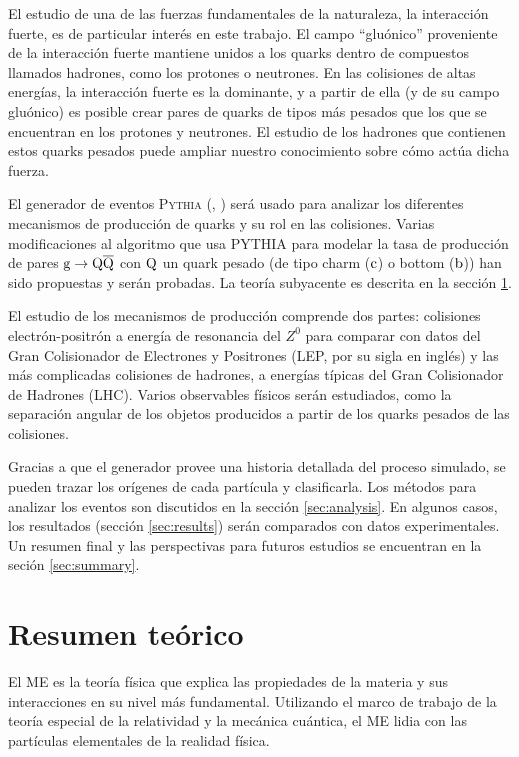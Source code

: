 \documentclass[a4paper,12pt]{article}
\begin{document}
El estudio de una de las fuerzas fundamentales de la naturaleza, la interacción fuerte, es de particular interés en este trabajo. El campo ``gluónico'' proveniente de la interacción fuerte mantiene unidos a los quarks dentro de compuestos llamados hadrones, como los protones o neutrones. En las colisiones de altas energías, la interacción fuerte es la dominante, y a partir de ella (y de su campo gluónico) es posible crear pares de quarks de tipos más pesados que los que se encuentran en los protones y neutrones. El estudio de los hadrones que contienen estos quarks pesados puede ampliar nuestro conocimiento sobre cómo actúa dicha fuerza.

El generador de eventos \textsc{Pythia} (\cite{Sjostrand:2006za}, \cite{Sjostrand:2007gs}) será usado para analizar los diferentes mecanismos de producción de quarks y su rol en las colisiones. Varias modificaciones al algoritmo que usa PYTHIA para modelar la tasa de producción de pares ${\mathrm g}\to{\mathrm Q}\overline{\mathrm Q}$ con ${\mathrm Q}$ un quark pesado (de tipo charm (${\mathrm c}$) o bottom (${\mathrm b}$)) han sido propuestas y serán probadas. La teoría subyacente es descrita en la sección \ref{sec:theoretical}.

El estudio de los mecanismos de producción comprende dos partes: colisiones electrón-positrón a energía de resonancia del $Z^0$ para comparar con datos del Gran Colisionador de Electrones y Positrones (LEP, por su sigla en inglés) y las más complicadas colisiones de hadrones, a energías típicas del Gran Colisionador de Hadrones (LHC). Varios observables físicos serán estudiados, como la separación angular de los objetos producidos a partir de los quarks pesados de las colisiones.

Gracias a que el generador provee una historia detallada del proceso simulado, se pueden trazar los orígenes de cada partícula y clasificarla. Los métodos para analizar los eventos son discutidos en la sección \ref{sec:analysis}. En algunos casos, los resultados (sección \ref{sec:results}) serán comparados con datos experimentales. Un resumen final y las perspectivas para futuros estudios se encuentran en la seción \ref{sec:summary}.

\section{Resumen teórico}
\label{sec:theoretical}

El ME es la teoría física  que explica las propiedades de la materia y sus interacciones en su nivel más fundamental. Utilizando el marco de trabajo de la teoría especial de la relatividad y la mecánica cuántica, el ME lidia con las partículas elementales de la realidad física.
\end{document}

